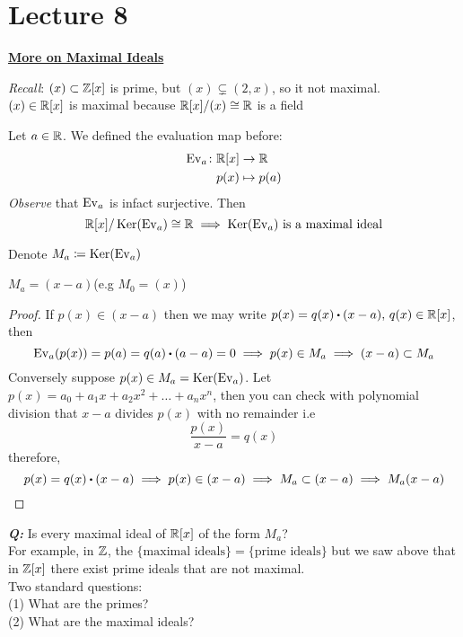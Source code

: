 \documentclass[../Main.tex]{subfiles}
\begin{document}
\chapter{Lecture 8}
\underline{\textbf{\Large More on Maximal Ideals}}

\textit{Recall}: $(x) \subset \mathbb{Z}[x]$ is prime, but $(x)\subsetneq (2,x)$, so it not maximal.\\
$(x)\in \mathbb{R}[x]$ is maximal because $\mathbb{R}[x]/(x) \cong \mathbb{R}$ is a field

\begin{example}
	Let $a\in \mathbb{R}$. We defined the evaluation map before:
	\begin{align*}
	\operatorname{Ev}_a\colon \mathbb{R}[x] &\to \mathbb{R} \\
	p(x) &\mapsto p(a)
	\end{align*}
	\textit{Observe} that $\operatorname{Ev}_a$ is infact surjective. Then
	\[\mathbb{R}[x]/\operatorname{Ker}(\operatorname{Ev}_a) \cong \mathbb{R} \implies \operatorname{Ker}(\operatorname{Ev}_a) \text{ is a maximal ideal}\]
\end{example}
	Denote $M_a\coloneqq \operatorname{Ker}(\operatorname{Ev}_a)$
	\begin{claim}
		$M_a = (x-a)$\quad (e.g $M_0 =(x)$)
	\end{claim}
	\begin{proof}
		If $p(x) \in (x-a)$ then we may write $p(x)=q(x)\rdot (x-a),\, q(x)\in \R[x]$, then
		\[\ev_a(p(x)) = p(a) = q(a)\rdot (a-a)=0 \implies p(x)\in M_a \implies (x-a) \subset M_a\] 
		Conversely suppose $p(x) \in M_a = \operatorname{Ker}(\operatorname{Ev}_a)$. Let $p(x) = a_0 + a_1x+a_2x^2+\dots+a_nx^n$, then you can check with polynomial division that $x-a$ divides $p(x)$ with no remainder i.e
		\[\frac{p(x)}{x-a} = q(x)\]
		therefore,
		\[p(x)=q(x)\rdot (x-a)\implies p(x) \in (x-a) \implies M_a \subset (x-a) \implies M_a (x-a)\]
	\end{proof}
\textbf{\textit{Q:}} Is every maximal ideal of $\mathbb{R}[x]$ of the form $M_a$?\\
For example, in $\mathbb{Z}$, the $\{\text{maximal ideals}\} =\{\text{prime ideals}\}$ but we saw above that in $\mathbb{Z}[x]$ there exist prime ideals that are not maximal.\\
Two standard questions:\\
(1) What are the primes?\\
(2) What are the maximal ideals?\\
\end{document}
